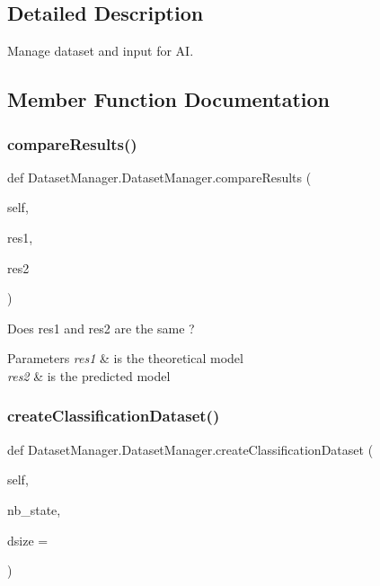 \subsection{Detailed Description}
Manage dataset and input for AI. 

\subsection{Member Function Documentation}
\mbox{\label{classDatasetManager_1_1DatasetManager_a47092104ac9bb0445ffbf3ad8e2727e0}} 
\subsubsection{\texorpdfstring{compareResults()}{compareResults()}}
{\footnotesize\ttfamily def Dataset\+Manager.\+Dataset\+Manager.\+compare\+Results (\begin{DoxyParamCaption}\item[{}]{self,  }\item[{}]{res1,  }\item[{}]{res2 }\end{DoxyParamCaption})}



Does res1 and res2 are the same ? 


\begin{DoxyParams}{Parameters}
{\em res1} & is the theoretical model \\
\hline
{\em res2} & is the predicted model \\
\hline
\end{DoxyParams}
\mbox{\label{classDatasetManager_1_1DatasetManager_aacab55c5dd501410186b7cb4eb49d3fc}} 
\subsubsection{\texorpdfstring{createClassificationDataset()}{createClassificationDataset()}}
{\footnotesize\ttfamily def Dataset\+Manager.\+Dataset\+Manager.\+create\+Classification\+Dataset (\begin{DoxyParamCaption}\item[{}]{self,  }\item[{}]{nb\+\_\+state,  }\item[{}]{dsize = {} }\end{DoxyParamCaption})}



